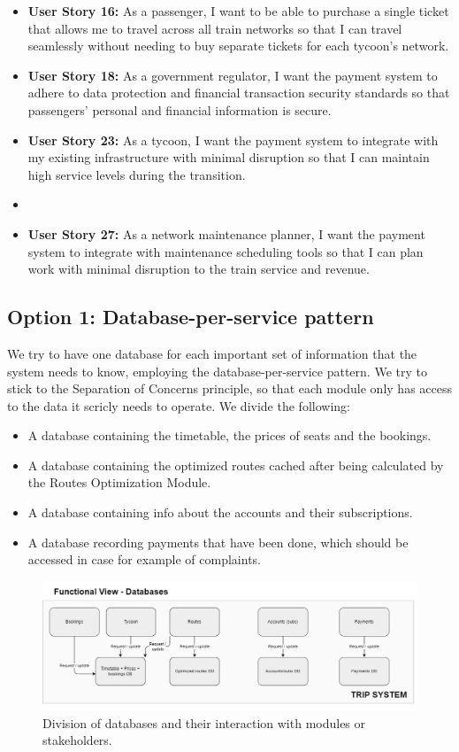 \begin{itemize}[noitemsep]
    \item \textbf{User Story 16:} As a passenger, I want to be able to purchase a single ticket that allows me to travel across all train networks so that I can travel seamlessly without needing to buy separate tickets for each tycoon's network.
    
    \item \textbf{User Story 18:} As a government regulator, I want the payment system to adhere to data protection and financial transaction security standards so that passengers' personal and financial information is secure.
    
    \item \textbf{User Story 23:} As a tycoon, I want the payment system to integrate with my existing infrastructure with minimal disruption so that I can maintain high service levels during the transition.
    \item 
    \item \textbf{User Story 27:} As a network maintenance planner, I want the payment system to integrate with maintenance scheduling tools so that I can plan work with minimal disruption to the train service and revenue.
\end{itemize}

\subsection*{Option 1: Database-per-service pattern}
We try to have one database for each important set of information that the system needs to know, employing the database-per-service pattern.
We try to stick to the Separation of Concerns principle, so that each module only has access to the data it scricly needs to operate.
We divide the following:
\begin{itemize}
    \item A database containing the timetable, the prices of seats and the bookings.
    \item A database containing the optimized routes cached after being calculated by the Routes Optimization Module.
    \item A database containing info about the accounts and their subscriptions. 
    \item A database recording payments that have been done, which should be accessed in case for example of complaints. 
\end{itemize}
\begin{figure}[ht]
    \centering
    \includegraphics[width=\textwidth]{drawings/views_draft2/functional_view databases.png}
    \caption{Division of databases and their interaction with modules or stakeholders.}
    \label{fig:databases_view}
\end{figure}

